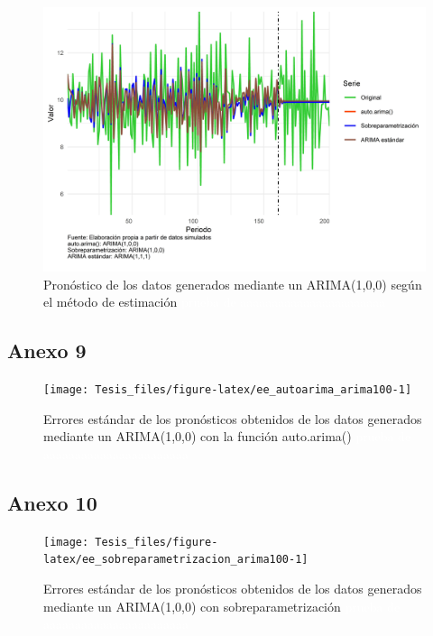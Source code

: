 \documentclass[
]{article}
\begin{document}
\begin{figure}[H]
\includegraphics[width=1\linewidth,height=1\textheight]{Tesis_files/figure-latex/pronostico_arima100-1} \caption{Pronóstico de los datos generados mediante un ARIMA(1,0,0) según el método de estimación \textcolor{white}{prueba de aaaaaaaaaaaaaaaaaaaaaaa}}\label{fig:pronostico_arima100}
\end{figure}

\subsection{Anexo 9}

\begin{figure}[H]
\texttt{[image: Tesis\_files/figure-latex/ee\_autoarima\_arima100-1]} \caption{Errores estándar de los pronósticos obtenidos de los datos generados mediante un ARIMA(1,0,0) con la función auto.arima() \textcolor{white}{prueba de aaaaaaaaaaaaaaaaaaaaaaa}}\label{fig:ee_autoarima_arima100}
\end{figure}

\subsection{Anexo 10}

\begin{figure}[H]
\texttt{[image: Tesis\_files/figure-latex/ee\_sobreparametrizacion\_arima100-1]} \caption{Errores estándar de los pronósticos obtenidos de los datos generados mediante un ARIMA(1,0,0) con sobreparametrización \textcolor{white}{prueba de aaaaaaaaaaaaaaaaaaaaaaa}}\label{fig:ee_sobreparametrizacion_arima100}
\end{figure}
\end{document}
